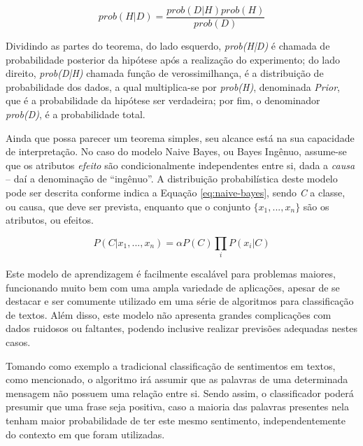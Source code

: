 \documentclass[oneside,openright,12pt]{ufsm_2015} %
\begin{document}
    \begin{equation} \label{eq:teorema-bayes}
    prob(H|D) = \frac{prob(D|H)prob(H)}{prob(D)}
    \end{equation}
    
    \par Dividindo as partes do teorema, do lado esquerdo, \textit{prob(H|D)} é chamada de probabilidade posterior da hipótese após a realização do experimento; do lado direito, \textit{prob(D|H)} chamada função de verossimilhança, é a distribuição de probabilidade dos dados, a qual multiplica-se por \textit{prob(H)}, denominada \textit{Prior}, que é a probabilidade da hipótese ser verdadeira; por fim, o denominador \textit{prob(D)}, é a probabilidade total.
    
    \par Ainda que possa parecer um teorema simples, seu alcance está na sua capacidade de interpretação. No caso do modelo Naive Bayes, ou Bayes Ingênuo, assume-se que os atributos \textit{efeito} são condicionalmente independentes entre si, dada a \textit{causa} -- daí a denominação de ``ingênuo''. A distribuição probabilística deste modelo pode ser descrita conforme indica a Equação \ref{eq:naive-bayes}, sendo \textit{C} a classe, ou causa, que deve ser prevista, enquanto que o conjunto $\{x_1, ..., x_n\}$ são os atributos, ou efeitos.
    
    \begin{equation} \label{eq:naive-bayes}
    P(C | x_1, ..., x_n) = \alpha P(C)\prod_i{P(x_i | C)}
    \end{equation}
    
    \par Este modelo de aprendizagem é facilmente escalável para problemas maiores, funcionando muito bem com uma ampla variedade de aplicações, apesar de se destacar e ser comumente utilizado em uma série de algoritmos para classificação de textos. Além disso, este modelo não apresenta grandes complicações com dados ruidosos ou faltantes, podendo inclusive realizar previsões adequadas nestes casos. %
    
    \par Tomando como exemplo a tradicional classificação de sentimentos em textos, como mencionado, o algoritmo irá assumir que as palavras de uma determinada mensagem não possuem uma relação entre si. Sendo assim, o classificador poderá presumir que uma frase seja positiva, caso a maioria das palavras presentes nela tenham maior probabilidade de ter este mesmo sentimento, independentemente do contexto em que foram utilizadas.
    
\end{document}
